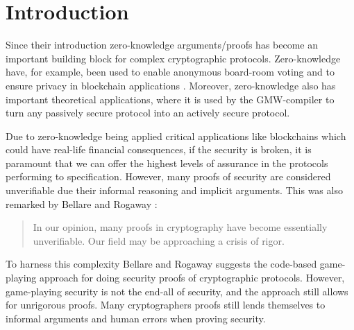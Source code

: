 \chapter{Introduction}
\label{ch:intro}
Since their introduction zero-knowledge arguments/proofs has become
an important building block for complex cryptographic protocols.
Zero-knowledge have, for example, been used to enable anonymous board-room
voting \cite{boardroom-voting} and to ensure privacy in blockchain applications \cite{concordium}.
Moreover, zero-knowledge also has important theoretical applications, where it
is used by the GMW-compiler to turn any passively secure protocol into an
actively secure protocol.

Due to zero-knowledge being applied critical applications like
blockchains which could have real-life financial consequences, if the security is
broken, it is paramount that we can offer the highest levels of assurance in the
protocols performing to specification.
However, many proofs of security are considered unverifiable due their informal
reasoning and implicit arguments. This was also remarked by Bellare and Rogaway \cite{game-playing}:

\begin{quote}
In our opinion, many proofs in cryptography have become essentially unverifiable. Our field may be approaching a crisis of rigor.
\end{quote}

To harness this complexity Bellare and Rogaway suggests the code-based game-playing approach
for doing security proofs of cryptographic protocols.
However, game-playing security is not the end-all of security, and the approach
still allows for unrigorous proofs. Many cryptographers proofs still lends
themselves to informal arguments and human errors when proving security.

